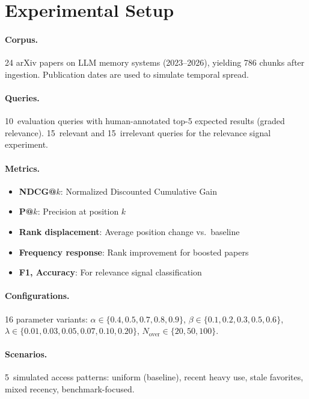 \documentclass[11pt,a4paper]{article}
\begin{document}
\section{Experimental Setup}
\label{sec:setup}

\paragraph{Corpus.}  24 arXiv papers on LLM memory systems (2023--2026),
yielding 786 chunks after ingestion.  Publication dates are used to
simulate temporal spread.

\paragraph{Queries.}  10~evaluation queries with human-annotated
top-5 expected results (graded relevance).  15~relevant and
15~irrelevant queries for the relevance signal experiment.

\paragraph{Metrics.}
\begin{itemize}
  \item \textbf{NDCG@$k$}: Normalized Discounted Cumulative Gain
  \item \textbf{P@$k$}: Precision at position $k$
  \item \textbf{Rank displacement}: Average position change vs.\ baseline
  \item \textbf{Frequency response}: Rank improvement for boosted papers
  \item \textbf{F1, Accuracy}: For relevance signal classification
\end{itemize}

\paragraph{Configurations.}  16 parameter variants: $\alpha \in
\{0.4, 0.5, 0.7, 0.8, 0.9\}$, $\beta \in \{0.1, 0.2, 0.3, 0.5,
0.6\}$, $\lambda \in \{0.01, 0.03, 0.05, 0.07, 0.10, 0.20\}$,
$N_{\text{over}} \in \{20, 50, 100\}$.

\paragraph{Scenarios.}  5~simulated access patterns: uniform (baseline),
recent heavy use, stale favorites, mixed recency, benchmark-focused.
\end{document}
